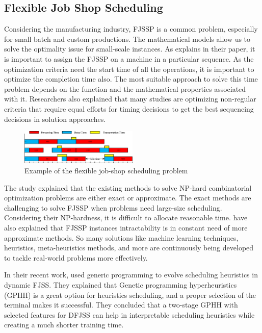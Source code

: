 \documentclass{article}
\begin{document}
\subsection{Flexible Job Shop Scheduling}
Considering the manufacturing industry, FJSSP is a common problem, especially for small batch and custom productions. The mathematical models allow us to solve the optimality issue for small-scale instances. As \cite{dauzere2024flexible} explains in their paper, it is important to assign the FJSSP on a machine in a particular sequence. As the optimization criteria need the start time of all the operations, it is important to optimize the completion time also. The most suitable approach to solve this time problem depends on the function and the mathematical properties associated with it. Researchers also explained that many studies are optimizing non-regular criteria that require equal efforts for timing decisions to get the best sequencing decisions in solution approaches. 
\vspace{1em}

\begin{figure}[ht]
  \centering
  \includegraphics[width=0.5\textwidth]{FJSSP.png} 
  \caption{Example of the flexible job-shop scheduling problem \cite{zhang2022novel}}
  \label{fig:image2}
\end{figure}

\vspace{1em}
The study \cite{lei2022multi} explained that the existing methods to solve NP-hard combinatorial optimization problems are either exact or approximate. The exact methods are challenging to solve FJSSP when problems need large-size scheduling. Considering their NP-hardness, it is difficult to allocate reasonable time. \cite{lei2022multi} have also explained that FJSSP instances intractability is in constant need of more approximate methods. So many solutions like machine learning techniques, heuristics, meta-heuristics methods, and more are continuously being developed to tackle real-world problems more effectively. 

\vspace{1em}
In their recent work, \cite{zhang2020evolving} used generic programming to evolve scheduling heuristics in dynamic FJSS. They explained that Genetic programming hyperheuristics (GPHH) is a great option for heuristics scheduling, and a proper selection of the terminal makes it successful. They concluded that a two-stage GPHH with selected features for DFJSS can help in interpretable scheduling heuristics while creating a much shorter training time.
\end{document}
